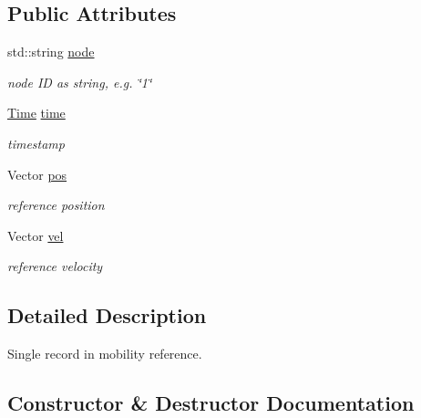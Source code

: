 \subsection*{Public Attributes}
\begin{DoxyCompactItemize}
\item 
std\+::string \hyperlink{structNs2MobilityHelperTest_1_1ReferencePoint_a5a41e1cb52c6045f3ccfe72503725786}{node}
\begin{DoxyCompactList}\small\item\em node ID as string, e.\+g. \char`\"{}1\char`\"{} \end{DoxyCompactList}\item 
\hyperlink{classns3_1_1Time}{Time} \hyperlink{structNs2MobilityHelperTest_1_1ReferencePoint_af7c24766bd747de6f4e7b04c6ed1d9d8}{time}
\begin{DoxyCompactList}\small\item\em timestamp \end{DoxyCompactList}\item 
Vector \hyperlink{structNs2MobilityHelperTest_1_1ReferencePoint_a6edac39e5b4dc90d23f87f203df974c8}{pos}
\begin{DoxyCompactList}\small\item\em reference position \end{DoxyCompactList}\item 
Vector \hyperlink{structNs2MobilityHelperTest_1_1ReferencePoint_ad0497008eed66c96fb0cf8484b734e99}{vel}
\begin{DoxyCompactList}\small\item\em reference velocity \end{DoxyCompactList}\end{DoxyCompactItemize}


\subsection{Detailed Description}
Single record in mobility reference. 

\subsection{Constructor \& Destructor Documentation}
